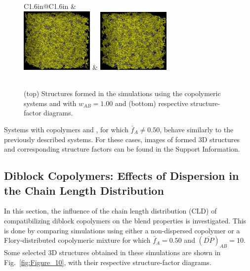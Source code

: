 \documentclass[
journal=mamobx,
manuscript=article,
]{achemso}
\begin{document}
\begin{figure}
	\centering
	\begin{tabular}{C{1.6in}@{}C{1.6in}}
		 \textcolor{white}{ } & \textcolor{white}{ } \\
		 \includegraphics[width=1.4in]{A2B3A3B2_100} & \includegraphics[width=1.4in]{A3B2A2B3_100} \\
		 \\
	\end{tabular}
	\caption{(top) Structures formed in the simulations using the copolymeric systems  and  with $w_{AB}=1.00$ and (bottom) respective structure-factor diagrams.}
	\label{fig:Figure_9}
\end{figure}

Systems with copolymers  and , for which $\bar{f}_A \neq 0.50$, behave similarly to the previously described systems.
For these cases, images of formed 3D structures and corresponding structure factors can be found in the Support Information.

\subsection{Diblock Copolymers: Effects of Dispersion in the Chain Length Distribution}
\label{sec:CLD effects}

In this section, the influence of the chain length distribution (CLD) of compatibilizing diblock copolymers on the blend properties is investigated.
This is done by comparing simulations using either a non-dispersed  copolymer or a Flory-distributed copolymeric mixture for which $\bar{f}_A = 0.50$ and $( \overline{DP} )_{AB} = 10$.
Some selected 3D structures obtained in these simulations are shown in Fig.~\ref{fig:Figure_10}, with their respective structure-factor diagrams.
\end{document}
